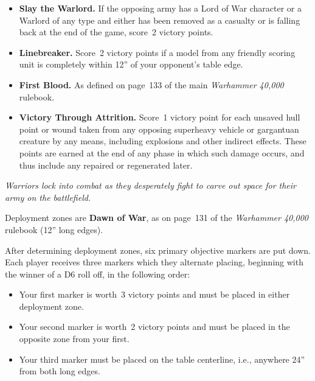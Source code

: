 \begin{itemize}
\item \textbf{Slay the Warlord.}  If the opposing army has a Lord of
  War character or a Warlord of any type and either has been removed
  as a casualty or is falling back at the end of the game, score~2
  victory points.

\item \textbf{Linebreaker.}  Score~2 victory points if a model from
  any friendly scoring unit is completely within 12'' of your
  opponent's table edge.

\item \textbf{First Blood.}  As defined on page~133 of the main
  \emph{Warhammer 40,000} rulebook.

\item \textbf{Victory Through Attrition.}  Score~1 victory point for
  each unsaved hull point or wound taken from any opposing superheavy
  vehicle or gargantuan creature by any means, including explosions
  and other indirect effects.  These points are earned at the end of
  any phase in which such damage occurs, and thus include any repaired
  or regenerated later.
\end{itemize}



\centerline{\emph{Warriors lock into combat as they desperately fight
    to carve out space for their army on the battlefield.}}


Deployment zones are \textbf{Dawn of War}, as on page~131 of the
\emph{Warhammer 40,000} rulebook (12'' long edges).

\bigskip%
After determining deployment zones, six primary objective markers are
put down.  Each player receives three markers which they alternate
placing, beginning with the winner of a D6 roll off, in the following
order:

\begin{itemize}
\item Your first marker is worth~3 victory points and must be placed
  in either deployment zone.

\item Your second marker is worth~2 victory points and must be placed
  in the opposite zone from your first.

\item Your third marker must be placed on the table centerline, i.e.,
  anywhere 24'' from both long edges.
\end{itemize}

